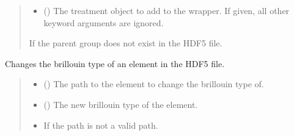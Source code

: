 \documentclass[letterpaper,10pt,english]{sphinxmanual}
\begin{document}
\begin{fulllineitems}
\begin{fulllineitems}
\begin{quote}
\begin{description}
\begin{itemize}
\item {} 
\sphinxAtStartPar
{} () \textendash{} The treatment object to add to the wrapper. If given, all other keyword arguments are ignored.

\end{itemize}

\sphinxAtStartPar
{\hyperref[\detokenize{source/_autosummary/HDF5_BLS.errors:HDF5_BLS.errors.WrapperError_StructureError}]{}} \textendash{} If the parent group does not exist in the HDF5 file.

\end{description}\end{quote}

\end{fulllineitems}


\begin{fulllineitems}
\label{\detokenize{source/_autosummary/HDF5_BLS.Wrapper:HDF5_BLS.Wrapper.change_brillouin_type}}
\pysigstartsignatures
\pysiglinewithargsret
{}
{\sphinxparamcomma {}}
{}
\pysigstopsignatures
\sphinxAtStartPar
Changes the brillouin type of an element in the HDF5 file.
\begin{quote}\begin{description}
\begin{itemize}
\item {} 
\sphinxAtStartPar
{} () \textendash{} The path to the element to change the brillouin type of.

\item {} 
\sphinxAtStartPar
{} () \textendash{} The new brillouin type of the element.

\end{itemize}

\begin{itemize}
\item {} 
\sphinxAtStartPar
{\hyperref[\detokenize{source/_autosummary/HDF5_BLS.errors:HDF5_BLS.errors.WrapperError_StructureError}]{}} \textendash{} If the path is not a valid path.


\end{itemize}
\end{description}
\end{quote}
\end{fulllineitems}
\end{fulllineitems}
\end{document}
